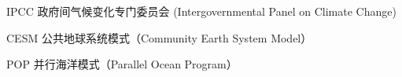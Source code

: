 \begin{denotation}[3cm]
\item[IPCC] 政府间气候变化专门委员会 (Intergovernmental Panel on Climate Change)
\item[CESM]  公共地球系统模式（Community Earth System Model）
\item[POP]  并行海洋模式（Parallel Ocean Program）
\end{denotation}
